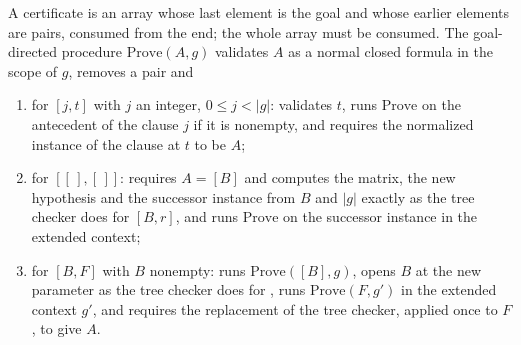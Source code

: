 \begin{definition}\label{cert:def:k-stream}
A certificate is an array whose last element is the goal and whose earlier
elements are pairs, consumed from the end; the whole array must be consumed.
The goal-directed procedure $\mathrm{Prove}(A,g)$ validates $A$ as a normal
closed formula in the scope of $g$, removes a pair and
\begin{enumerate}[label=(\roman*)]
\item for $[j,t]$ with $j$ an integer, $0\le j<\lvert g\rvert$: validates $t$,
runs $\mathrm{Prove}$ on the antecedent of the clause $j$ if it is nonempty,
and requires the normalized instance of the clause at $t$ to be $A$;
\item for $[[\,],[\,]]$: requires $A=[B]$ and computes the matrix, the new
hypothesis and the successor instance from $B$ and $\lvert g\rvert$ exactly as
the tree checker does for $[B,r]$, and runs $\mathrm{Prove}$ on the successor
instance in the extended context;
\item for $[B,F]$ with $B$ nonempty: runs $\mathrm{Prove}([B],g)$, opens $B$ at
the new parameter as the tree checker does for , runs
$\mathrm{Prove}(F,g')$ in the extended context $g'$, and requires the
replacement of the tree checker, applied once to $F$, to give $A$.
\end{enumerate}
\end{definition}

